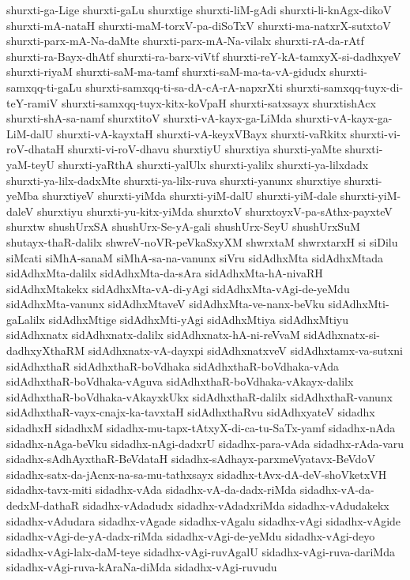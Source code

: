 {shurxti-ga-Lige
shurxti-gaLu
shurxtige
shurxti-liM-gAdi
shurxti-li-knAgx-dikoV
shurxti-mA-nataH
shurxti-maM-torxV-pa-diSoTxV
shurxti-ma-natxrX-sutxtoV
shurxti-parx-mA-Na-daMte
shurxti-parx-mA-Na-vilalx
shurxti-rA-da-rAtf
shurxti-ra-Bayx-dhAtf
shurxti-ra-barx-viVtf
shurxti-reY-kA-tamxyX-si-dadhxyeV
shurxti-riyaM
shurxti-saM-ma-tamf
shurxti-saM-ma-ta-vA-gidudx
shurxti-samxqq-ti-gaLu
shurxti-samxqq-ti-sa-dA-cA-rA-napxrXti
shurxti-samxqq-tuyx-di-teY-ramiV
shurxti-samxqq-tuyx-kitx-koVpaH
shurxti-satxsayx
shurxtishAcx
shurxti-shA-sa-namf
shurxtitoV
shurxti-vA-kayx-ga-LiMda
shurxti-vA-kayx-ga-LiM-dalU
shurxti-vA-kayxtaH
shurxti-vA-keyxVBayx
shurxti-vaRkitx
shurxti-vi-roV-dhataH
shurxti-vi-roV-dhavu
shurxtiyU
shurxtiya
shurxti-yaMte
shurxti-yaM-teyU
shurxti-yaRthA
shurxti-yalUlx
shurxti-yalilx
shurxti-ya-lilxdadx
shurxti-ya-lilx-dadxMte
shurxti-ya-lilx-ruva
shurxti-yanunx
shurxtiye
shurxti-yeMba
shurxtiyeV
shurxti-yiMda
shurxti-yiM-dalU
shurxti-yiM-dale
shurxti-yiM-daleV
shurxtiyu
shurxti-yu-kitx-yiMda
shurxtoV
shurxtoyxV-pa-sAthx-payxteV
shurxtw
shushUrxSA
shushUrx-Se-yA-gali
shushUrx-SeyU
shushUrxSuM
shutayx-thaR-dalilx
shwreV-noVR-peVkaSxyXM
shwrxtaM
shwrxtarxH
si
siDilu
siMcati
siMhA-sanaM
siMhA-sa-na-vanunx
siVru
sidAdhxMta
sidAdhxMtada
sidAdhxMta-dalilx
sidAdhxMta-da-sAra
sidAdhxMta-hA-nivaRH
sidAdhxMtakekx
sidAdhxMta-vA-di-yAgi
sidAdhxMta-vAgi-de-yeMdu
sidAdhxMta-vanunx
sidAdhxMtaveV
sidAdhxMta-ve-nanx-beVku
sidAdhxMti-gaLalilx
sidAdhxMtige
sidAdhxMti-yAgi
sidAdhxMtiya
sidAdhxMtiyu
sidAdhxnatx
sidAdhxnatx-dalilx
sidAdhxnatx-hA-ni-reVvaM
sidAdhxnatx-si-dadhxyXthaRM
sidAdhxnatx-vA-dayxpi
sidAdhxnatxveV
sidAdhxtamx-va-sutxni
sidAdhxthaR
sidAdhxthaR-boVdhaka
sidAdhxthaR-boVdhaka-vAda
sidAdhxthaR-boVdhaka-vAguva
sidAdhxthaR-boVdhaka-vAkayx-dalilx
sidAdhxthaR-boVdhaka-vAkayxkUkx
sidAdhxthaR-dalilx
sidAdhxthaR-vanunx
sidAdhxthaR-vayx-cnajx-ka-tavxtaH
sidAdhxthaRvu
sidAdhxyateV
sidadhx
sidadhxH
sidadhxM
sidadhx-mu-tapx-tAtxyX-di-ca-tu-SaTx-yamf
sidadhx-nAda
sidadhx-nAga-beVku
sidadhx-nAgi-dadxrU
sidadhx-para-vAda
sidadhx-rAda-varu
sidadhx-sAdhAyxthaR-BeVdataH
sidadhx-sAdhayx-parxmeVyatavx-BeVdoV
sidadhx-satx-da-jAcnx-na-sa-mu-tathxsayx
sidadhx-tAvx-dA-deV-shoVketxVH
sidadhx-tavx-miti
sidadhx-vAda
sidadhx-vA-da-dadx-riMda
sidadhx-vA-da-dedxM-dathaR
sidadhx-vAdadudx
sidadhx-vAdadxriMda
sidadhx-vAdudakekx
sidadhx-vAdudara
sidadhx-vAgade
sidadhx-vAgalu
sidadhx-vAgi
sidadhx-vAgide
sidadhx-vAgi-de-yA-dadx-riMda
sidadhx-vAgi-de-yeMdu
sidadhx-vAgi-deyo
sidadhx-vAgi-lalx-daM-teye
sidadhx-vAgi-ruvAgalU
sidadhx-vAgi-ruva-dariMda
sidadhx-vAgi-ruva-kAraNa-diMda
sidadhx-vAgi-ruvudu
}
